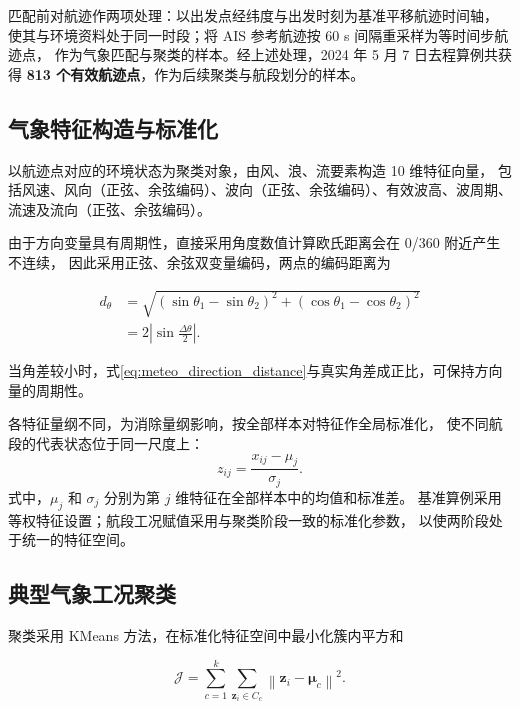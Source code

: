 \documentclass[UTF8,a4paper,twoside,zihao=5,fontset=windows]{ctexart}
\begin{document}
匹配前对航迹作两项处理：以出发点经纬度与出发时刻为基准平移航迹时间轴，
使其与环境资料处于同一时段；将 AIS 参考航迹按 60 s 间隔重采样为等时间步航迹点，
作为气象匹配与聚类的样本。经上述处理，2024 年 5 月 7 日去程算例共获得
\textbf{813 个有效航迹点}，作为后续聚类与航段划分的样本。

\subsection{气象特征构造与标准化}

以航迹点对应的环境状态为聚类对象，由风、浪、流要素构造 10 维特征向量，
包括风速、风向（正弦、余弦编码）、波向（正弦、余弦编码）、有效波高、波周期、
流速及流向（正弦、余弦编码）。

由于方向变量具有周期性，直接采用角度数值计算欧氏距离会在 0\textdegree{}/360\textdegree{} 附近产生不连续，
因此采用正弦、余弦双变量编码，两点的编码距离为

\begin{equation}
\begin{aligned}
d_\theta&=\sqrt{(\sin\theta_1-\sin\theta_2)^2+(\cos\theta_1-\cos\theta_2)^2}\\
&=2\left|\sin\frac{\Delta\theta}{2}\right|.
\end{aligned}
\label{eq:meteo_direction_distance}
\end{equation}

当角差较小时，式\eqref{eq:meteo_direction_distance}与真实角差成正比，可保持方向量的周期性。

各特征量纲不同，为消除量纲影响，按全部样本对特征作全局标准化，
使不同航段的代表状态位于同一尺度上：
\begin{equation}
z_{ij}=\frac{x_{ij}-\mu_j}{\sigma_j}.
\label{eq:meteo_standardization}
\end{equation}
式中，$\mu_j$ 和 $\sigma_j$ 分别为第 $j$ 维特征在全部样本中的均值和标准差。
基准算例采用等权特征设置；航段工况赋值采用与聚类阶段一致的标准化参数，
以使两阶段处于统一的特征空间。

\subsection{典型气象工况聚类}

聚类采用 KMeans 方法，在标准化特征空间中最小化簇内平方和

\begin{equation}
\mathcal{J}=\sum_{c=1}^{k}\sum_{\boldsymbol{z}_i\in C_c}
\left\|\boldsymbol{z}_i-\boldsymbol{\mu}_c\right\|^2.
\label{eq:meteo_kmeans_objective}
\end{equation}
\end{document}
